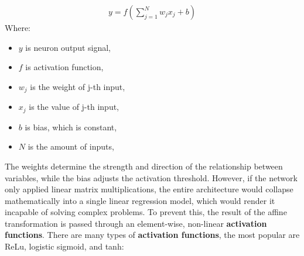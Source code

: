 \begin{align}
	y = f\left( \sum_{j=1}^{N} w_j x_j + b \right)
\end{align} 
Where:
\begin{itemize}
	\item $y$ is neuron output signal,
	\item $f$ is activation function,
	\item $w_j$ is the weight of j-th input,
	\item $x_j$ is the value of j-th input,
	\item $b$ is bias, which is constant,
	\item $N$ is the amount of inputs,
\end{itemize}
The weights determine the strength and direction of the relationship between variables, while the bias adjusts the activation threshold. However, if the network only applied linear matrix multiplications, the entire architecture would collapse mathematically into a single linear regression model, which would render it incapable of solving complex problems. To prevent this, the result of the affine transformation is passed through an element-wise, non-linear \textbf{activation functions}. There are many types of \textbf{activation functions}, the most popular are ReLu, logistic sigmoid, and tanh:
